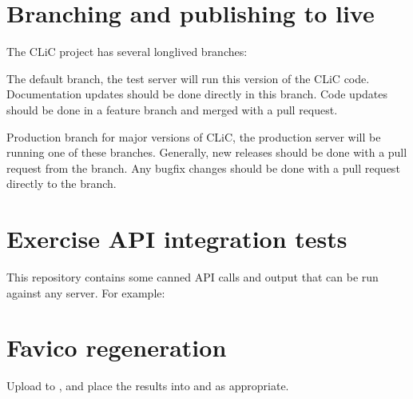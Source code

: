 \documentclass[letterpaper,10pt,english]{sphinxmanual}
\begin{document}
\section{Branching and publishing to live}
\label{\detokenize{advanced/development:branching-and-publishing-to-live}}
\sphinxAtStartPar
The CLiC project has several long\sphinxhyphen{}lived branches:
\begin{description}
\sphinxAtStartPar
The default branch, the test server will run this version of the CLiC code.
Documentation updates should be done directly in this branch.
Code updates should be done in a feature branch and merged with a pull request.

\sphinxAtStartPar
Production branch for major versions of CLiC, the production server will be running one of these branches.
Generally, new releases should be done with a pull request from the  branch.
Any bug\sphinxhyphen{}fix changes should be done with a pull request directly to the  branch.

\end{description}


\section{Exercise API integration tests}
\label{\detokenize{advanced/development:exercise-api-integration-tests}}
\sphinxAtStartPar
This repository contains some canned API calls and output that can be run against
any server. For example:

\begin{sphinxVerbatim}[commandchars=\\\{\}]
  
\end{sphinxVerbatim}


\section{Favico regeneration}
\label{\detokenize{advanced/development:favico-regeneration}}
\sphinxAtStartPar
Upload  to , and place the results into
 and  as appropriate.
\end{document}
